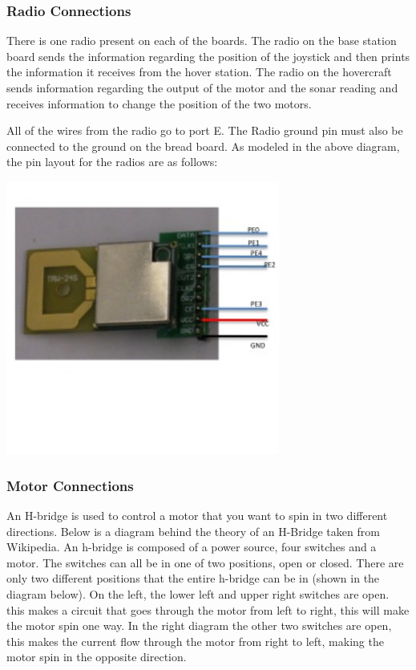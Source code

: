 \subsubsection{Radio Connections}
\label{radioconn}


There is one radio present on each of the boards. The radio on the base station board sends the information regarding the position of the joystick and then prints the information it receives from the hover station.  The radio on the hovercraft sends information regarding the output of the motor and the sonar reading and receives information to change the position of the two motors.

All of the wires from the radio go to port E. The Radio ground pin must also be connected to the ground on the bread board. As modeled in the above diagram, the pin layout for the radios are as follows:

  \begin{minipage}{6.5in}
  \centering
    \includegraphics[width=90mm]{imageSources/radioConnect.png}
  
  \label{radioConnect}
\end{minipage}

\subsubsection{Motor Connections}
An H-bridge is used to  control a motor that you want to spin in two different directions. Below is a diagram behind the theory of an H-Bridge taken from Wikipedia. An h-bridge is composed of a power source, four switches and a motor. The switches can all be in one of two positions, open or closed. There are only two different positions that the entire h-bridge can be in (shown in the diagram below). On the left, the lower left and upper right switches are open. this makes a circuit that goes through the motor from left to right, this will make the motor spin one way.  In the right diagram the other two switches are open, this makes the current flow through the motor from right to left, making the motor spin in the opposite direction.

